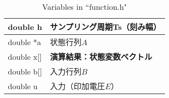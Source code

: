 \documentclass[a4paper,10pt,twocolumn,fleqn]{jarticle}
\begin{document}
    \begin{table}[htp]
      \centering
      \caption{Variables in ``function.h"}
      \label{function.h}
      \begin{tabular}{|l|l|}
      \hline
      double h       & サンプリング周期Ts（刻み幅） \\ \hline
      double *a      & 状態行列$A$ \\ \hline
      double x{[}{]} & \bf 演算結果：状態変数ベクトル  \\ \hline
      double b{[}{]} & 入力行列$B$ \\ \hline
      double u       & 入力（印加電圧$E$）  \\ \hline
      \end{tabular}
    \end{table}
\end{document}
